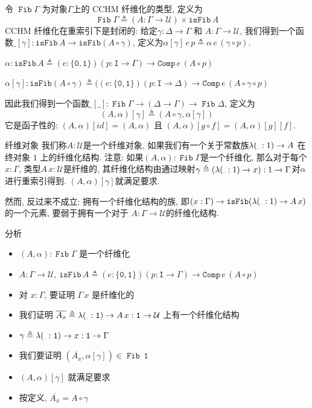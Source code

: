 \documentclass[aspectratio=169,xcolor=dvipsnames]{beamer}
\newcommand\calU{\mathcal{U}}
\newcommand\isFib{\mathtt{isFib}}
\newcommand\Comp{\mathtt{Comp}}
\newcommand\ttI{\mathtt{I}}
\newcommand\ttzero{\mathtt{0}}
\newcommand\ttone{\mathtt{1}}
\newcommand{\ul}{{\scalebox{0.4}[0.4]{\_}}}
\DeclareMathOperator\Fib{\mathtt{Fib}}
\begin{document}
\begin{frame}
  令 $\Fib\Gamma$ 为对象$\Gamma$上的 CCHM 纤维化的类型, 定义为
  \[
  \Fib\Gamma\triangleq(A:\Gamma\to\calU)\times\isFib\,A
  \]
  CCHM 纤维化在重索引下是封闭的: 给定$\gamma:\Delta\to\Gamma$ 和 $A:\Gamma\to\calU$, 我们得到一个函数$\_[\gamma]:\isFib\,A\to\isFib(A\circ\gamma)$, 定义为$\alpha[\gamma]\,e\,p\triangleq\alpha\,e\,(\gamma\circ p)$.
\begin{framed}
  $\alpha:\isFib\,A\triangleq(e:\{\ttzero,\ttone\})(p:\ttI\to\Gamma)\to\Comp\,e\,(A\circ p)$
  
  $\alpha[\gamma]:\isFib(A\circ\gamma)\triangleq((e:\{\ttzero,\ttone\})(p:\ttI\to\Delta)\to\Comp\,e\,(A\circ\gamma\circ p)$
\end{framed}
因此我们得到一个函数$\_[\_]:\Fib\Gamma\to(\Delta\to\Gamma)\to\Fib\Delta$, 定义为
\[
(A,\alpha)[\gamma]\triangleq(A\circ\gamma,\alpha[\gamma])
\]
它是函子性的: $(A,\alpha)[id]=(A,\alpha)$ 且 $(A,\alpha)[g\circ f]=(A,\alpha)[g][f]$.
\end{frame}

\begin{frame}{纤维对象}
  我们称$A:\calU$是一个纤维对象, 如果我们有一个关于常数族$\lambda(\ul:1)\to A$ 在终对象 $1$ 上的纤维化结构. 注意: 如果$(A,\alpha):\Fib\Gamma$是一个纤维化, 那么对于每个$x:\Gamma$, 类型$A\,x:\calU$是纤维的, 其纤维化结构由通过映射$\gamma\triangleq(\lambda(\ul:1)\to x):1\to\Gamma$对$\alpha$进行重索引得到. $(A,\alpha)[\gamma]$就满足要求.

  \bigskip  

  然而, 反过来不成立: 拥有一个纤维化结构的族, 即$(x:\Gamma)\to\isFib(\lambda(\ul:1)\to A\,x)$ 的一个元素, 要弱于拥有一个对于 $A:\Gamma\to\calU$的纤维化结构.
\end{frame}

\begin{frame}{分析}
\begin{itemize}
  \item $(A,\alpha):\Fib\Gamma$ 是一个纤维化
  \item $A:\Gamma\to\calU$, $\isFib\, A\triangleq(e:\{\ttzero,\ttone\})(p:\ttI\to\Gamma)\to\Comp\,e\,(A\circ p)$
  \item 对 $x : \Gamma$, 要证明 $\Gamma\, x$ 是纤维化的
  \item 我们证明 $\overline{A_x}\triangleq\lambda(\ul:\ttone)\to A\,x : \ttone\to\calU$ 上有一个纤维化结构
  \item $\gamma \triangleq \lambda(\ul:\ttone)\to x : \ttone \to \Gamma$
  \item 我们要证明 $(\overline{A_x},\alpha[\gamma]) \in \Fib\,\ttone$
  \item $(A,\alpha)[\gamma]$ 就满足要求
  \item 按定义, $\overline{A_x} = A\circ\gamma$
\end{itemize}
\end{frame}
\end{document}
